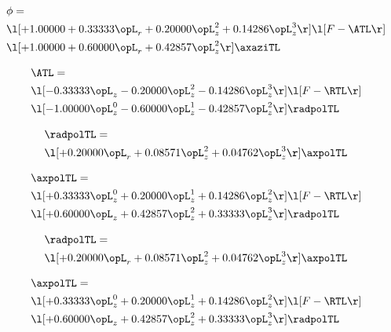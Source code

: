 \begin{alignat}{2} 
\label{eq:scalarFlux_0} 
& \phi = \\ 
& \l[ + 1.00000 + 0.33333 \opL_r + 0.20000 \opL_z^{2} + 0.14286 \opL_z^{3}  \r] \l[ F - \ATL \r] \nonumber \\ 
& \l[ + 1.00000 + 0.60000 \opL_r + 0.42857 \opL_z^{2}  \r] \axaziTL \nonumber \\ 
\end{alignat} 


\begin{alignat}{2} 
\label{eq:isoATL_0} 
& \ATL = \\ 
& \l[   -0.33333 \opL_z   -0.20000 \opL_z^{2}   -0.14286 \opL_z^{3}  \r] \l[ F - \RTL \r] \nonumber \\ 
& \l[   -1.00000 \opL_z^{0}   -0.60000 \opL_z^{1}   -0.42857 \opL_z^{2}  \r] \radpolTL \nonumber \\ 
\end{alignat} 


\begin{alignat}{2} 
\label{eq:linradpolTL_0} 
& \radpolTL = \\ 
& \l[ + 0.20000 \opL_r + 0.08571 \opL_z^{2} + 0.04762 \opL_z^{3}  \r] \axpolTL \nonumber \\ 
\end{alignat} 


\begin{alignat}{2} 
\label{eq:linaxpolTL_0} 
& \axpolTL = \\ 
& \l[ + 0.33333 \opL_z^{0} + 0.20000 \opL_z^{1} + 0.14286 \opL_z^{2}  \r] \l[ F - \RTL \r] \nonumber \\ 
& \l[ + 0.60000 \opL_z + 0.42857 \opL_z^{2} + 0.33333 \opL_z^{3}  \r] \radpolTL \nonumber \\ 
\end{alignat} 


\begin{alignat}{2} 
\label{eq:linradpolTL_1} 
& \radpolTL = \\ 
& \l[ + 0.20000 \opL_r + 0.08571 \opL_z^{2} + 0.04762 \opL_z^{3}  \r] \axpolTL \nonumber \\ 
\end{alignat} 


\begin{alignat}{2} 
\label{eq:linaxpolTL_1} 
& \axpolTL = \\ 
& \l[ + 0.33333 \opL_z^{0} + 0.20000 \opL_z^{1} + 0.14286 \opL_z^{2}  \r] \l[ F - \RTL \r] \nonumber \\ 
& \l[ + 0.60000 \opL_z + 0.42857 \opL_z^{2} + 0.33333 \opL_z^{3}  \r] \radpolTL \nonumber \\ 
\end{alignat} 


